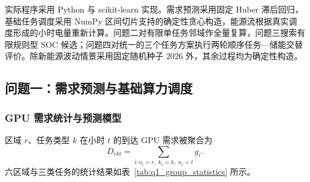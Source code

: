 \documentclass[withoutpreface,bwprint]{cumcmthesis}
\begin{document}

实际程序采用 Python 与 scikit-learn 实现。需求预测采用固定 Huber 滞后回归，基础任务调度采用 NumPy 区间切片支持的确定性贪心构造，能源流根据真实调度形成的小时电量重新计算。问题二对有限单任务邻域作全量复算，问题三搜索有限规则型 SOC 候选；问题四对统一的三个任务方案执行两轮顺序任务—储能交替评价。除新能源波动情景采用固定随机种子 $2026$ 外，其余过程均为确定性构造。

\subsection{问题一：需求预测与基础算力调度}

\subsubsection{GPU 需求统计与预测模型}

区域 $r$、任务类型 $k$ 在小时 $t$ 的到达 GPU 需求被聚合为
\begin{equation}
D_{rkt}=\sum_{i:o_i=r,\;k_i=k,\;a_i=t}g_i.
\end{equation}
六区域与三类任务的统计结果如表~\ref{tab:q1_group_statistics} 所示。
\end{document}
